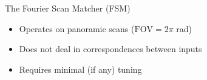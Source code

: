 \begin{frame}[noframenumbering]{The Fourier Scan Matcher (FSM)}

  \begin{itemize}
    \item Operates on panoramic scans ($\text{FOV} = 2\pi$ rad)
    \item Does not deal in correspondences between inputs
    \item Requires minimal (if any) tuning
  \end{itemize}

\end{frame}
